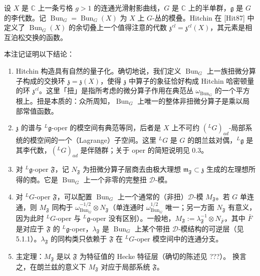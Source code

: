 
 设 $X$ 是 $\mathbb{C}$ 上一条亏格 $g>1$ 的连通光滑射影曲线，$G$ 是 $\mathbb{C}$ 上的半单群，$\mathfrak{g}$ 是 $G$ 的李代数。记 $\operatorname{Bun}_G=\operatorname{Bun}_G(X)$ 为 $X$ 上 $G$-丛的模叠。Hitchin 在 [Hit87] 中定义了 $\operatorname{Bun}_G(X)$ 的余切叠上一个值得注意的代数 $\mathfrak{z}^{cl}=\mathfrak{z}^{cl}(X)$，其元素是相互泊松交换的函数。

 本注记证明以下结论：

\begin{enumerate}[label=(\alph*),leftmargin=2.2em]
\item Hitchin 构造具有自然的量子化。确切地说，我们定义 $\operatorname{Bun}_G$ 上一族扭微分算子构成的交换环 $\mathfrak{z}=\mathfrak{z}(X)$，使得 $\mathfrak{z}$ 中算子的象征恰好构成 Hitchin 哈密顿量的环 $\mathfrak{z}^{cl}$。这里「扭」是指所考虑的微分算子作用在典范丛 $\omega_{\operatorname{Bun}_G}$ 的一个平方根上。扭是本质的：众所周知，$\operatorname{Bun}_G$ 上唯一的整体非扭微分算子是乘以局部常值函数。

\item $\mathfrak{z}$ 的谱与 $^{L}\mathfrak{g}$-oper 的模空间有典范等同，后者是 $X$ 上不可约 $(^{L}G)_{ad}$-局部系统的模空间的一个（Lagrange）子空间。这里 $^{L}G$ 是 $G$ 的朗兰兹对偶，$^{L}\mathfrak{g}$ 是其李代数，$(^{L}G)_{ad}$ 是伴随群；关于 oper 的简短说明见 0.3。

\item 对 $^{L}\mathfrak{g}$-oper $\mathfrak{F}$，记 $N_{\mathfrak{F}}$ 为扭微分算子层商去由极大理想 $\mathfrak{m}_{\mathfrak{F}}\subset\mathfrak{z}$ 生成的左理想所得的商。它是 $\operatorname{Bun}_G$ 上一个非零的完整扭 $\mathcal{D}$-模。

\item 对 $^{L}G$-oper $\mathfrak{F}$，可以配置 $\operatorname{Bun}_G$ 上一个通常的（非扭）$\mathcal{D}$-模 $M_{\mathfrak{F}}$。若 $G$ 单连通，则 $M_{\mathfrak{F}}$ 同构于 $\omega_{\operatorname{Bun}_G}^{-1/2}\otimes N_{\mathfrak{F}}$（单连通时 $\omega_{\operatorname{Bun}_G}^{1/2}$ 唯一；另一方面 $N_{\mathfrak{F}}$ 有意义，因为此时 $^{L}G$-oper 与 $^{L}\mathfrak{g}$-oper 没有区别）。一般地，$M_{\mathfrak{F}}:=\lambda_{\mathfrak{F}}^{-1}\otimes N_{\bar F}$，其中 $\bar F$ 是对应于 $\mathfrak{F}$ 的 $^{L}\mathfrak{g}$-oper，$\lambda_{\mathfrak{F}}$ 是 $\operatorname{Bun}_G$ 上某个带扭 $\mathcal{D}$-模结构的可逆层（见 5.1.1）。$\lambda_{\mathfrak{F}}$ 的同构类只依赖于 $\mathfrak{F}$ 在 $^{L}G$-oper 模空间中的连通分支。

\item 主定理：$M_{\mathfrak{F}}$ 是以 $\mathfrak{F}$ 为特征值的 Hecke 特征层（确切的陈述见 ???）。
换言之，在朗兰兹的意义下 $M_{\mathfrak{F}}$ 对应于局部系统 $\mathfrak{F}$。
\end{enumerate}

